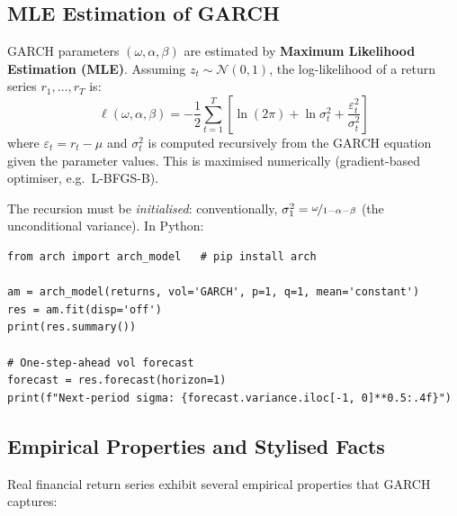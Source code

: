 \documentclass[12pt,a4paper,openany]{report}
\theoremstyle{definition}
\begin{document}
\subsection{MLE Estimation of GARCH}

GARCH parameters $(\omega, \alpha, \beta)$ are estimated by \textbf{Maximum Likelihood Estimation (MLE)}. Assuming $z_t \sim \mathcal{N}(0,1)$, the log-likelihood of a return series $r_1, \ldots, r_T$ is:
\[
  \ell(\omega, \alpha, \beta) = -\frac{1}{2}\sum_{t=1}^{T}\left[\ln(2\pi) + \ln\sigma_t^2 + \frac{\varepsilon_t^2}{\sigma_t^2}\right]
\]
where $\varepsilon_t = r_t - \hat{\mu}$ and $\sigma_t^2$ is computed recursively from the GARCH equation given the parameter values. This is maximised numerically (gradient-based optimiser, e.g.\ L-BFGS-B).

The recursion must be \emph{initialised}: conventionally, $\sigma_1^2 = \nicefrac{\omega}{1-\alpha-\beta}$ (the unconditional variance). In Python:

\begin{lstlisting}
from arch import arch_model   # pip install arch

am = arch_model(returns, vol='GARCH', p=1, q=1, mean='constant')
res = am.fit(disp='off')
print(res.summary())

# One-step-ahead vol forecast
forecast = res.forecast(horizon=1)
print(f"Next-period sigma: {forecast.variance.iloc[-1, 0]**0.5:.4f}")
\end{lstlisting}

\subsection{Empirical Properties and Stylised Facts}

Real financial return series exhibit several empirical properties that GARCH captures:
\end{document}
